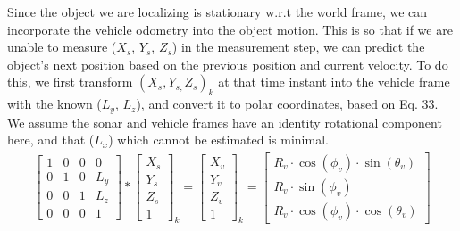 \documentclass[15pt]{article}
\newcommand{\XSonar}{$\si{\textit{X}_{s}}$\xspace}
\newcommand{\YSonar}{$\si{\textit{Y}_{s}}$\xspace}
\newcommand{\ZSonar}{$\si{\textit{Z}_{s}}$\xspace}
\begin{document}
Since the object we are localizing is stationary w.r.t the world frame, we can incorporate the vehicle odometry into the object motion. This is so that if we are unable to measure (\XSonar, \YSonar, \ZSonar) in the measurement step, we can predict the object's next position based on the previous position and current velocity. To do this, we first transform $(X_{s},Y_{s,}Z_{s})_{k}$ at that time instant into the vehicle frame with the known ($L_{y}$, $L_{z}$), and convert it to polar coordinates, based on Eq. 33. We assume the sonar and vehicle frames have an identity rotational component here, and that ($L_{x}$) which cannot be estimated is minimal.
\begin{gather}
\left[\begin{array}{cccc}
1 & 0 & 0 & 0\\
0 & 1 & 0 & L_{y}\\
0 & 0 & 1 & L_{z}\\
0 & 0 & 0 & 1
\end{array}\right]*\left[\begin{array}{c}
X_{s}\\
Y_{s}\\
Z_{s}\\
1
\end{array}\right]_{k}=\left[\begin{array}{c}
X_{v}\\
Y_{v}\\
Z_{v}\\
1
\end{array}\right]_{k}=\left[\begin{array}{c}
R_{v}\cdot\cos\left(\phi_{v}\right)\cdot\sin\left(\theta_{v}\right)\\
R_{v}\cdot\sin\left(\phi_{v}\right)\\
R_{v}\cdot\cos\left(\phi_{v}\right)\cdot\cos\left(\theta_{v}\right)
\end{array}\right]
\end{gather}
\end{document}
